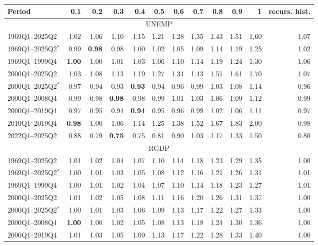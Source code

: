 \begin{tabular}{lrrrrrrrrrrr}
\hline
Period & 0.1 & 0.2 & 0.3 & 0.4 & 0.5 & 0.6 & 0.7 & 0.8 & 0.9 & 1 & recurs. hist. \\
\hline
\multicolumn{12}{c}{UNEMP} \\
1969Q1--2025Q2 & 1.02 & 1.06 & 1.10 & 1.15 & 1.21 & 1.28 & 1.35 & 1.43 & 1.51 & 1.60 & 1.07 \\
1969Q1--2025Q2$^*$ & 0.99 & \textbf{0.98} & 0.98 & 1.00 & 1.02 & 1.05 & 1.09 & 1.14 & 1.19 & 1.25 & 1.02 \\
1969Q1--1999Q4 & \textbf{1.00} & 1.00 & 1.01 & 1.03 & 1.06 & 1.10 & 1.14 & 1.19 & 1.24 & 1.30 & 1.06 \\
2000Q1--2025Q2 & 1.03 & 1.08 & 1.13 & 1.19 & 1.27 & 1.34 & 1.43 & 1.51 & 1.61 & 1.70 & 1.07 \\
2000Q1--2025Q2$^*$ & 0.97 & 0.94 & 0.93 & \textbf{0.93} & 0.94 & 0.96 & 0.99 & 1.03 & 1.08 & 1.14 & 0.96 \\
2000Q1--2008Q4 & 0.99 & 0.98 & \textbf{0.98} & 0.98 & 0.99 & 1.01 & 1.03 & 1.06 & 1.09 & 1.12 & 0.99 \\
2000Q1--2019Q4 & 0.97 & 0.95 & 0.94 & \textbf{0.94} & 0.95 & 0.96 & 0.99 & 1.02 & 1.06 & 1.11 & 0.97 \\
2010Q1--2019Q4 & \textbf{0.98} & 1.00 & 1.06 & 1.14 & 1.25 & 1.38 & 1.52 & 1.67 & 1.83 & 2.00 & 0.98 \\
2022Q1--2025Q2 & 0.88 & 0.79 & \textbf{0.75} & 0.75 & 0.81 & 0.90 & 1.03 & 1.17 & 1.33 & 1.50 & 0.80 \\
\hline
\multicolumn{12}{c}{RGDP} \\
1969Q1--2025Q2 & 1.01 & 1.02 & 1.04 & 1.07 & 1.10 & 1.14 & 1.18 & 1.23 & 1.29 & 1.35 & 1.00 \\
1969Q1--2025Q2$^*$ & 1.00 & 1.01 & 1.03 & 1.05 & 1.08 & 1.12 & 1.16 & 1.21 & 1.26 & 1.31 & 1.01 \\
1969Q1--1999Q4 & 1.00 & 1.01 & 1.02 & 1.04 & 1.07 & 1.10 & 1.14 & 1.18 & 1.23 & 1.27 & 1.01 \\
2000Q1--2025Q2 & 1.01 & 1.02 & 1.05 & 1.08 & 1.11 & 1.16 & 1.20 & 1.26 & 1.31 & 1.37 & 1.00 \\
2000Q1--2025Q2$^*$ & 1.00 & 1.01 & 1.03 & 1.06 & 1.09 & 1.13 & 1.17 & 1.22 & 1.27 & 1.33 & 1.00 \\
2000Q1--2008Q4 & \textbf{1.00} & 1.00 & 1.02 & 1.05 & 1.08 & 1.13 & 1.18 & 1.24 & 1.30 & 1.36 & 1.00 \\
2000Q1--2019Q4 & 1.01 & 1.03 & 1.05 & 1.09 & 1.13 & 1.17 & 1.22 & 1.28 & 1.33 & 1.40 & 1.00 \\

\end{tabular}
